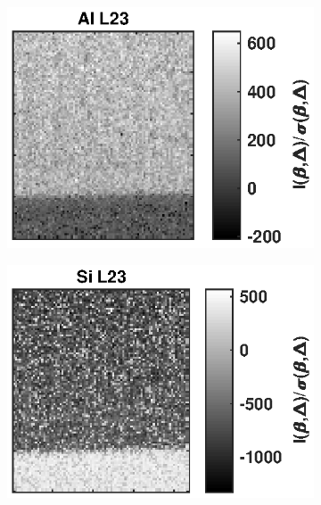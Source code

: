 \documentclass[%
 aip,
rsi,%
 amsmath,amssymb,
 reprint,%
]{revtex4-1}
\begin{document}

\begin{figure}
	\centering
    \begin{subfigure}{0.3\textwidth}
    	\includegraphics[width=\textwidth]{qAlMap}
        \subcaption{}
        \label{fig:qAlMap}
    \end{subfigure}
    \begin{subfigure}{0.3\textwidth}
    	\includegraphics[width=\textwidth]{qSiMap}
        \subcaption{}
        \label{fig:qSiMap}
    \end{subfigure}
    

\end{figure}
\end{document}
